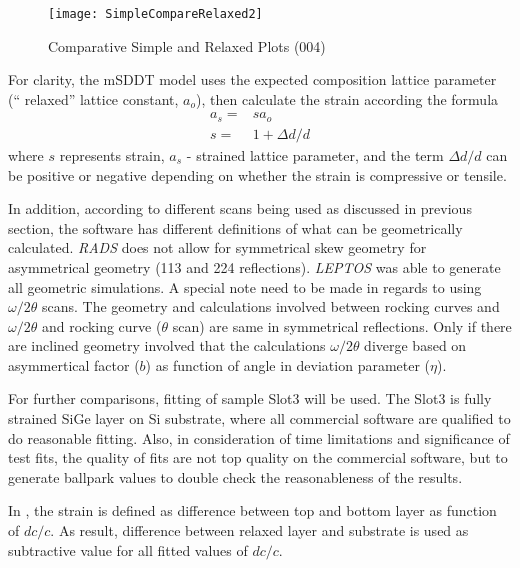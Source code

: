 \begin{figure}[ht]%
\caption{Comparative Simple and Relaxed Plots (004)}
\label{CSRP}
\begin{minipage}{0.85\linewidth}
\texttt{[image: SimpleCompareRelaxed2]}
\end{minipage}
\end{figure}

For clarity, the mSDDT model uses the expected composition lattice parameter (`` relaxed'' lattice constant, $a_o$), then calculate the strain according the formula
\begin{align}
a_s =&sa_o\\
s =& 1 + \Delta d/d
\end{align}
where $s$ represents strain, $a_s$ - strained lattice parameter, and the term $\Delta d/d$ can be positive or negative depending on whether the strain is compressive or tensile.

In addition, according to different scans being used as discussed in previous section, the software has different definitions of what can be geometrically calculated.   {\textit{RADS}} does not allow for symmetrical skew geometry for asymmetrical geometry (113 and 224 reflections).  {\textit{LEPTOS}} was able to generate all geometric simulations.  A special note need to be made in regards to using $\omega/2\theta$ scans.  The geometry and calculations involved between rocking curves and $\omega/2\theta$ and rocking curve ($\theta$ scan) are same in symmetrical reflections.  Only if there are inclined geometry involved that the calculations $\omega/2\theta$ diverge based on asymmertical factor ($b$) as function of angle in deviation parameter ($\eta$).

For further comparisons, fitting of sample Slot3 will be used.  The Slot3 is fully strained SiGe layer on Si substrate, where all commercial software are qualified to do reasonable fitting.  Also, in consideration of time limitations and significance of test fits, the quality of fits are not top quality on the commercial software, but to generate ballpark values to double check the reasonableness of the results.

In \LEPTOS, the strain is defined as difference between top and bottom layer as function of $dc/c$.  As result, difference between relaxed layer and substrate is used as subtractive value for all fitted values of $dc/c$.


